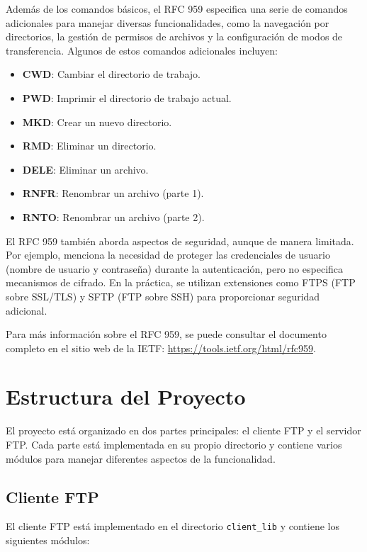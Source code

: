 \documentclass[a4paper, 12pt]{article}
\begin{document}
Además de los comandos básicos, el RFC 959 especifica una serie de comandos adicionales para manejar diversas funcionalidades, como la navegación por directorios, la gestión de permisos de archivos y la configuración de modos de transferencia. Algunos de estos comandos adicionales incluyen:

\begin{itemize}
    \item \textbf{CWD}: Cambiar el directorio de trabajo.
    \item \textbf{PWD}: Imprimir el directorio de trabajo actual.
    \item \textbf{MKD}: Crear un nuevo directorio.
    \item \textbf{RMD}: Eliminar un directorio.
    \item \textbf{DELE}: Eliminar un archivo.
    \item \textbf{RNFR}: Renombrar un archivo (parte 1).
    \item \textbf{RNTO}: Renombrar un archivo (parte 2).
\end{itemize}

El RFC 959 también aborda aspectos de seguridad, aunque de manera limitada. Por ejemplo, menciona la necesidad de proteger las credenciales de usuario (nombre de usuario y contraseña) durante la autenticación, pero no especifica mecanismos de cifrado. En la práctica, se utilizan extensiones como FTPS (FTP sobre SSL/TLS) y SFTP (FTP sobre SSH) para proporcionar seguridad adicional.

Para más información sobre el RFC 959, se puede consultar el documento completo en el sitio web de la IETF: \url{https://tools.ietf.org/html/rfc959}.

\section{Estructura del Proyecto}
El proyecto está organizado en dos partes principales: el cliente FTP y el servidor FTP. Cada parte está implementada en su propio directorio y contiene varios módulos para manejar diferentes aspectos de la funcionalidad.

\subsection{Cliente FTP}
El cliente FTP está implementado en el directorio \texttt{client\_lib} y contiene los siguientes módulos:
\end{document}

